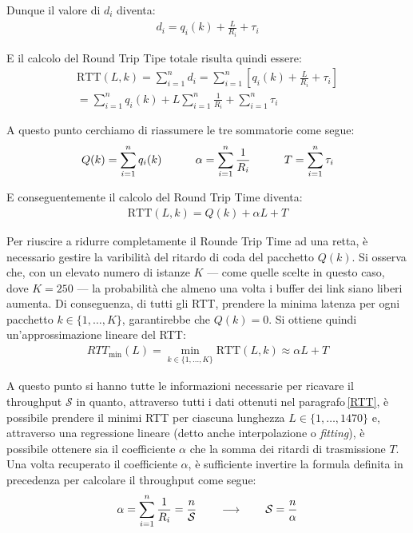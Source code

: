 \noindent Dunque il valore di $d_i$ diventa:
\begin{gather*}
    d_i = q_i(k) + \frac{L}{R_i} + \tau_i
\end{gather*}

\noindent E il calcolo del Round Trip Tipe totale risulta quindi essere:
\begin{gather*}
    \text{RTT}(L, k) = \sum_{i = 1}^n d_i = \sum_{i = 1}^n\left[q_i(k) + \frac{L}{R_i} + \tau_i\right] \\
    = \sum_{i = 1}^n q_i(k) + L\sum_{i = 1}^n\frac{1}{R_i} + \sum_{i = 1}^n\tau_i
\end{gather*}

\noindent A questo punto cerchiamo di riassumere le tre sommatorie come segue:
\begin{gather*}
    Q(k) = \sum_{i = 1}^n q_i(k) \hspace{30px} \alpha = \sum_{i = 1}^n\frac{1}{R_i} \hspace{30px} T = \sum_{i = 1}^n\tau_i
\end{gather*}

\noindent E conseguentemente il calcolo del Round Trip Time diventa:
\begin{gather*}
    \text{RTT}(L, k) = Q(k) + \alpha L + T
\end{gather*}

\noindent Per riuscire a ridurre completamente il Rounde Trip Time ad una retta, è necessario gestire la varibilità del ritardo di coda del pacchetto $Q(k)$. Si osserva che, con un elevato numero di istanze $K$ — come quelle scelte in questo caso, dove $K = 250$ — la probabilità che almeno una volta i buffer dei link siano liberi aumenta. Di conseguenza, di tutti gli RTT, prendere la minima latenza per ogni pacchetto $k \in \{1, \dots, K\}$, garantirebbe che $Q(k) = 0$. Si ottiene quindi un'approssimazione lineare del RTT\@:
\begin{gather*}
    RTT_{\text{min}}(L) = \min_{k \in \{1, \dots, K\}} \text{RTT}(L, k) \approx \alpha L + T
\end{gather*}

\noindent A questo punto si hanno tutte le informazioni necessarie per ricavare il throughput $\mathcal{S}$ in quanto, attraverso tutti i dati ottenuti nel paragrafo\,\ref{RTT}, è possibile prendere il minimi RTT per ciascuna lunghezza $L \in \{1,\dots, 1470\}$ e, attraverso una regressione lineare (detto anche interpolazione o \textsl{fitting}), è possibile ottenere sia il coefficiente $\alpha$ che la somma dei ritardi di trasmissione $T$. Una volta recuperato il coefficiente $\alpha$, è sufficiente invertire la formula definita in precedenza per calcolare il throughput come segue:
\begin{gather*}
    \alpha = \sum_{i = 1}^n\frac{1}{R_i} = \frac{n}{\mathcal{S}} \hspace{20px} \longrightarrow \hspace{20px} \mathcal{S} = \frac{n}{\alpha}
\end{gather*}

